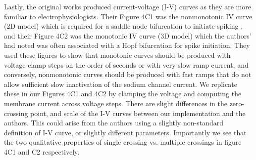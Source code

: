 Lastly, the original works produced current-voltage (I-V) curves as they are more familiar to electrophysiologists. Their Figure 4C1 was the nonmonotonic IV curve (2D model) which is required for a saddle node bifurcation to initiate spiking \cite{Qian2014}, and their Figure 4C2 was the monotonic IV curve (3D model) which the authors’ had noted was often associated with a Hopf bifurcation for spike initiation. They used these figures to show that monotonic curves should be produced with voltage clamp steps on the order of seconds or with very slow ramp current, and conversely, nonmonotonic curves should be produced with fast ramps that do not allow sufficient slow inactivation of the sodium channel current. We replicate these in our Figures 4C1 and 4C2 by clamping the voltage and computing the membrane current across voltage steps. There are slight differences in the zero-crossing point, and scale of the I-V curves between our implementation and the authors. This could arise from the authors using a slightly non-standard definition of I-V curve, or slightly different parameters. Importantly we see that the two qualitative properties of single crossing vs. multiple crossings in figure 4C1 and C2 respectively.

